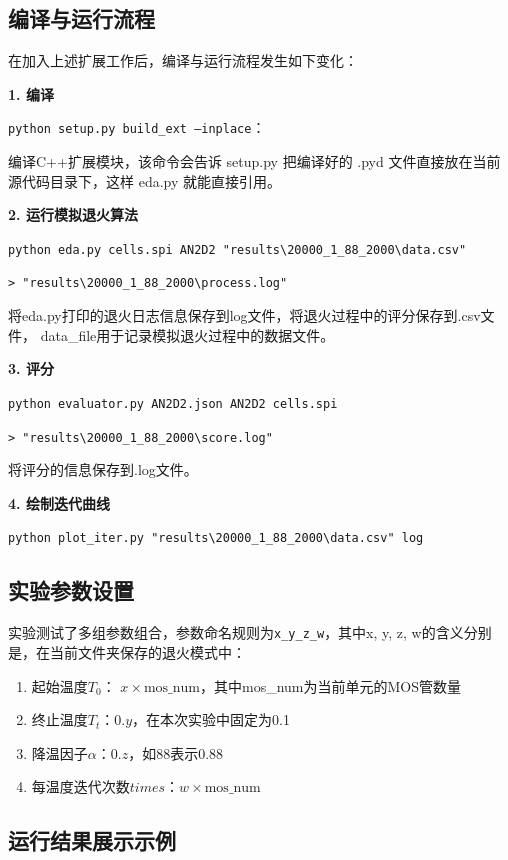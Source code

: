 \documentclass[UTF8,12pt,a4paper]{ctexart}
\begin{document}
\subsection{编译与运行流程}
在加入上述扩展工作后，编译与运行流程发生如下变化：

\textbf{1. 编译}

\texttt{python setup.py build\_ext --inplace}：

编译C++扩展模块，该命令会告诉 setup.py 把编译好的 .pyd 文件直接放在当前源代码目录下，这样 eda.py 就能直接引用。

\textbf{2. 运行模拟退火算法}

\verb|python eda.py cells.spi AN2D2 "results\20000_1_88_2000\data.csv"| 

\verb|> "results\20000_1_88_2000\process.log"|

将eda.py打印的退火日志信息保存到log文件，将退火过程中的评分保存到.csv文件， data\_file用于记录模拟退火过程中的数据文件。

\textbf{3. 评分}

\verb|python evaluator.py AN2D2.json AN2D2 cells.spi| 

\verb|> "results\20000_1_88_2000\score.log"|

将评分的信息保存到.log文件。

\textbf{4. 绘制迭代曲线}

\verb|python plot_iter.py "results\20000_1_88_2000\data.csv" log|

\subsection{实验参数设置}

实验测试了多组参数组合，参数命名规则为\texttt{x\_y\_z\_w}，其中x, y, z, w的含义分别是，在当前文件夹保存的退火模式中：
\begin{enumerate}
	\item 起始温度$T_0$： $x \times \text{mos\_num}$，其中mos\_num为当前单元的MOS管数量
	\item 终止温度$T_t$：$0.y$，在本次实验中固定为0.1
	\item 降温因子$\alpha$：$0.z$，如88表示0.88
	\item 每温度迭代次数$times$：$w \times \text{mos\_num}$
\end{enumerate}

\subsection{运行结果展示示例}
\end{document}
